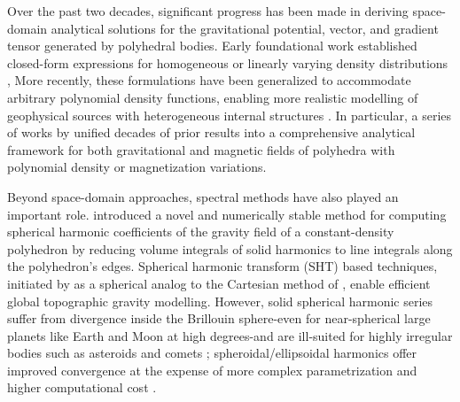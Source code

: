 \documentclass{seg}
\begin{document}
Over the past two decades, significant progress has been made in deriving space-domain analytical solutions for the gravitational potential, vector, and gradient tensor generated by polyhedral bodies. Early foundational work established closed-form expressions for homogeneous or linearly varying density distributions 
\citep{Barnett1976Geophysics,Okabe1979Geophysics,Holstein1996Geophysics,Werner1996CelestialMechDynAstr,Pohanka1998GeophysicalProspecting,Tsoulis2001Geophysics,Holstein2003Geophysics,Tsoulis2012Geophysics}, More recently, these formulations have been generalized to accommodate arbitrary polynomial density functions, enabling more realistic modelling of geophysical sources with heterogeneous internal structures \citep{DUrso2017SurvGeophys}. In particular, a series of works by \citet{Ren2017SurvGeophys,Ren2018GEOPHYSICS,Ren2020SurvGeophys,Ren2022GeophysicalResearchLetters} unified decades of prior results into a comprehensive analytical framework for both gravitational and magnetic fields of polyhedra with polynomial density or magnetization variations.

Beyond space-domain approaches, spectral methods have also played an important role. \citet{Jamet2020JGeod} introduced a novel and numerically stable method for computing spherical harmonic coefficients of the gravity field of a constant-density polyhedron by reducing volume integrals of solid harmonics to line integrals along the polyhedron's edges. Spherical harmonic transform (SHT) based techniques, initiated by \citet{Wieczorek1998J.Geophys.Res.} as a spherical analog to the Cartesian method of \citet{Parker1973GeophysJInt}, enable efficient global topographic gravity modelling. However, solid spherical harmonic series suffer from divergence inside the Brillouin sphere-even for near-spherical large planets like Earth and Moon at high degrees-and are ill-suited for highly irregular bodies such as asteroids and comets \citep{Hu2015JGeod,Reimond2016JGRPlanets,Hirt2017JGRPlanets,Hirt2019GeophysicalResearchLetters,Bucha2019JGeod,Sprlak2021Earth-ScienceReviews}; spheroidal/ellipsoidal harmonics offer improved convergence at the expense of more complex parametrization and higher computational cost \citep{Wang2013JGeod,Claessens2013JGRSolidEarth,Rexer2016SurvGeophysa,Liu2025SurvGeophys}. 
\end{document}
